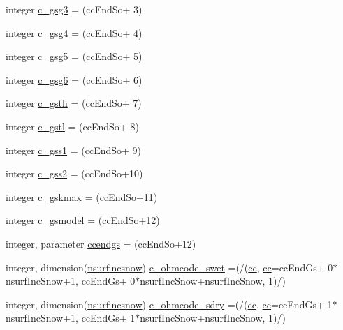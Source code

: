 \begin{DoxyCompactItemize}
\item 
integer \hyperlink{namespaceallocatearray_a70972d48cf32e2ae2f264134371657eb}{c\+\_\+gsg3} = (cc\+End\+So+ 3)
\item 
integer \hyperlink{namespaceallocatearray_ade39cdbf936049001075bb06589629d8}{c\+\_\+gsg4} = (cc\+End\+So+ 4)
\item 
integer \hyperlink{namespaceallocatearray_a1b25f9c9a9281958b7ed21d0bb85dde1}{c\+\_\+gsg5} = (cc\+End\+So+ 5)
\item 
integer \hyperlink{namespaceallocatearray_ab8971a61a031605df883466bf12f9c11}{c\+\_\+gsg6} = (cc\+End\+So+ 6)
\item 
integer \hyperlink{namespaceallocatearray_abf62bf3e83784366ed95fdfaae1f1d92}{c\+\_\+gsth} = (cc\+End\+So+ 7)
\item 
integer \hyperlink{namespaceallocatearray_aa11ae08cca1b320e3e176e06ac0daa50}{c\+\_\+gstl} = (cc\+End\+So+ 8)
\item 
integer \hyperlink{namespaceallocatearray_aee67f7f4bcae37b7727fdeeb7570e7de}{c\+\_\+gss1} = (cc\+End\+So+ 9)
\item 
integer \hyperlink{namespaceallocatearray_af79468bbe3d4485e8a4f27d33c674864}{c\+\_\+gss2} = (cc\+End\+So+10)
\item 
integer \hyperlink{namespaceallocatearray_a69cae8cc47b53e83d621a7abe318ff14}{c\+\_\+gskmax} = (cc\+End\+So+11)
\item 
integer \hyperlink{namespaceallocatearray_a0372ecc61cfb88ee683fac861aab87ac}{c\+\_\+gsmodel} = (cc\+End\+So+12)
\item 
integer, parameter \hyperlink{namespaceallocatearray_a58b7fd051dfe010900cccf4da1dd09c0}{ccendgs} = (cc\+End\+So+12)
\item 
integer, dimension(\hyperlink{namespaceallocatearray_af4d113f332b6759cfa22271140c9162d}{nsurfincsnow}) \hyperlink{namespaceallocatearray_a2b9b6b72c78faf563c2341e3e9d5e93d}{c\+\_\+ohmcode\+\_\+swet} =(/(\hyperlink{namespaceallocatearray_ac863c81704eb507dee10f5e10741e10c}{cc}, \hyperlink{namespaceallocatearray_ac863c81704eb507dee10f5e10741e10c}{cc}=cc\+End\+Gs+ 0$\ast$nsurf\+Inc\+Snow+1, cc\+End\+Gs+ 0$\ast$nsurf\+Inc\+Snow+nsurf\+Inc\+Snow, 1)/)
\item 
integer, dimension(\hyperlink{namespaceallocatearray_af4d113f332b6759cfa22271140c9162d}{nsurfincsnow}) \hyperlink{namespaceallocatearray_a22d9674e6c45c469b459ce0ac39d6320}{c\+\_\+ohmcode\+\_\+sdry} =(/(\hyperlink{namespaceallocatearray_ac863c81704eb507dee10f5e10741e10c}{cc}, \hyperlink{namespaceallocatearray_ac863c81704eb507dee10f5e10741e10c}{cc}=cc\+End\+Gs+ 1$\ast$nsurf\+Inc\+Snow+1, cc\+End\+Gs+ 1$\ast$nsurf\+Inc\+Snow+nsurf\+Inc\+Snow, 1)/)

\end{DoxyCompactItemize}
